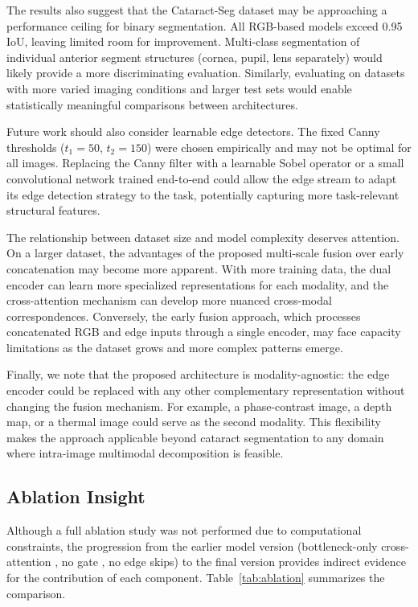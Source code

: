 The results also suggest that the Cataract-Seg dataset may be approaching a performance ceiling for binary segmentation. All RGB-based models exceed 0.95 IoU, leaving limited room for improvement. Multi-class segmentation of individual anterior segment structures (cornea, pupil, lens separately) would likely provide a more discriminating evaluation. Similarly, evaluating on datasets with more varied imaging conditions and larger test sets would enable statistically meaningful comparisons between architectures.

Future work should also consider learnable edge detectors. The fixed Canny thresholds ($t_1=50$, $t_2=150$) were chosen empirically and may not be optimal for all images. Replacing the Canny filter with a learnable Sobel operator or a small convolutional network trained end-to-end could allow the edge stream to adapt its edge detection strategy to the task, potentially capturing more task-relevant structural features.

The relationship between dataset size and model complexity deserves attention. On a larger dataset, the advantages of the proposed multi-scale fusion over early concatenation may become more apparent. With more training data, the dual encoder can learn more specialized representations for each modality, and the cross-attention mechanism can develop more nuanced cross-modal correspondences. Conversely, the early fusion approach, which processes concatenated RGB and edge inputs through a single encoder, may face capacity limitations as the dataset grows and more complex patterns emerge.

Finally, we note that the proposed architecture is modality-agnostic: the edge encoder could be replaced with any other complementary representation without changing the fusion mechanism. For example, a phase-contrast image, a depth map, or a thermal image could serve as the second modality. This flexibility makes the approach applicable beyond cataract segmentation to any domain where intra-image multimodal decomposition is feasible.

\subsection{Ablation Insight}

Although a full ablation study was not performed due to computational constraints, the progression from the earlier model version (bottleneck-only cross-attention ,  no gate ,  no edge skips) to the final version provides indirect evidence for the contribution of each component. Table~\ref{tab:ablation} summarizes the comparison.

